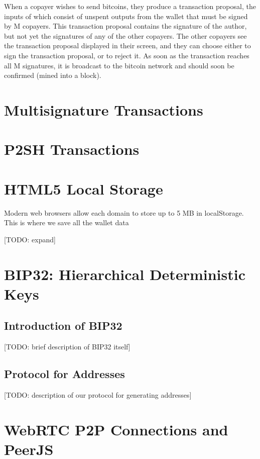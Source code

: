 \documentclass{article}
\begin{document}
When a copayer wishes to send bitcoins, they produce a transaction proposal, the inputs of which consist of unspent outputs from the wallet that must be signed by M copayers.
This transaction proposal contains the signature of the author, but not yet the signatures of any of the other copayers.
The other copayers see the transaction proposal displayed in their screen, and they can choose either to sign the transaction proposal, or to reject it.
As soon as the transaction reaches all M signatures, it is broadcast to the bitcoin network and should soon be confirmed (mined into a block).

\section{Multisignature Transactions}

\section{P2SH Transactions}

\section{HTML5 Local Storage}

Modern web browsers allow each domain to store up to 5 MB in localStorage. This is where we save all the wallet data

[TODO: expand]

\section{BIP32: Hierarchical Deterministic Keys}

\subsection{Introduction of BIP32}

[TODO: brief description of BIP32 itself]

\subsection{Protocol for Addresses}

[TODO: description of our protocol for generating addresses]

\section{WebRTC P2P Connections and PeerJS}
\end{document}
